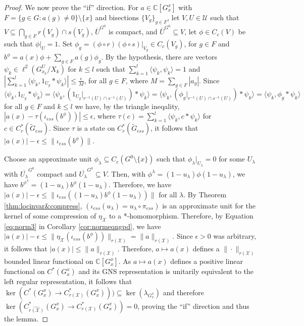\documentclass[a4paper, 12pt]{amsart}
\theoremstyle{definition}
\theoremstyle{remark}
\numberwithin{equation}{section}
\begin{document}
\begin{proof}
We now prove the ``if'' direction. For $a\in \mathbb{C}[G^{x}_{x}]$ with $F = \{g\in G:a(g)\neq 0\}\setminus \{x\}$ and bisections $\{V_{g}\}_{g\in F}$, let $V,U\in\mathcal{U}$ such that $V\subseteq \bigcap_{g\in F}r(V_{g})\cap s(V_{g})$, $\overline{U}^{G^{0}}$ is compact, and $\overline{U}^{G^{0}}\subseteq V$, let $\phi\in C_{c}(V)$ be such that $\phi|_{U} = 1$. Set $\phi_{g} = (\phi\circ r)(\phi\circ s)|_{V_{g}}\in C_{c}(V_{g})$, for $g\in F$ and $b^{\phi} = a(x)\phi + \sum_{g\in F}a(g)\phi_{g}$. By the hypothesis, there are vectors $\psi_{k}\in \ell^{2}(G^{U}_{x_{k}}/X_{k})$ for $k\leq l$ such that $\sum^{l}_{k=1} \langle\psi_{k}, \psi_{k}\rangle = 1$ and $|\sum^{l}_{k=1}\langle \psi_{k}, 1_{U_{g}}*\psi_{k}\rangle| \leq \frac{\epsilon}{M}$, for all $g\in F$, where $M = \sum_{g\in F} |a_{g}|$. Since $\langle \psi_{k}, 1_{U_{g}}*\psi_{k}\rangle = \langle \psi_{k}, (1_{U_{g}}|_{r^{-1}(U)\cap s^{-1}(U)})*\psi_{k}\rangle = \langle \psi_{k}, (\phi_{g}|_{r^{-1}(U)\cap s^{-1}(U)})*\psi_{k}\rangle = \langle \psi_{k}, \phi_{g}*\psi_{k}\rangle$ for all $g\in F$ and $k\leq l$ we have, by the triangle ineqality, $|a(x) - \tau(\iota_{ess}(b^{\phi}))|\leq \epsilon$, where $\tau(c) = \sum^{l}_{k=1}\langle \psi_{k}, c*\psi_{k}\rangle$ for $c\in C^{*}_{r}(\tilde{G}_{ess})$. Since $\tau$ is a state on $C^{*}_{r}(\tilde{G}_{ess})$, it follows that $|a(x)| - \epsilon \leq \|\iota_{ess}(b^{\phi})\|$. 

Choose an approximate unit $\phi_{\lambda}\subseteq C_{c}(G^{0}\setminus \{x\})$ such that $\phi_{\lambda}|_{U_{\lambda}} = 0$ for some $U_{\lambda}$ with $\overline{U_{\lambda}}^{G^{0}}$ compact and $\overline{U_{\lambda}}^{G^{0}}\subseteq V$. Then, with $\phi^{\lambda} = (1-u_{\lambda})\phi(1-u_{\lambda})$, we have $b^{\phi^{\lambda}} = (1-u_{\lambda})b^{\phi}(1-u_{\lambda})$. Therefore, we have $|a(x)| - \epsilon \leq \|\iota_{ess}((1-u_{\lambda})b^{\phi}(1-u_{\lambda}))\|$ for all $\lambda$. By Theorem \ref{thm:locinvar&compress}, $(\iota_{ess}(u_{\lambda}) = u_{\lambda}\circ \pi_{ess})$ is an approximate unit for the kernel of some compression of $\eta_{\mathcal{X}}$ to a *-homomorphism. Therefore, by Equation \ref{eq:norm3} in Corollary \ref{cor:normeqngpd}, we have $|a(x)| - \epsilon \leq \|\eta_{\mathcal{X}}(\iota_{ess}(b^{\phi}))\|_{r(\mathcal{X})} = \|a\|_{r(\mathcal{X})}$. Since $\epsilon > 0$ was arbitrary, it follows that $|a(x)|\leq \|a\|_{r(\mathcal{X})}$. Therefore, $a\mapsto a(x)$ defines a $\|\cdot\|_{r(\mathcal{X})}$ bounded linear functional on $\mathbb{C}[G^{x}_{x}]$. As $a\mapsto a(x)$ defines a positive linear functional on $C^{*}(G^{x}_{x})$ and its GNS representation is unitarily equivalent to the left regular representation, it follows that $\ker(C^{*}(G_{x}^{x})\to C_{r(\mathcal{X})}^{*}(G^{x}_{x})))\subseteq \ker(\lambda_{G^{x}_{x}})$ and therefore $\ker(C^{*}_{\widehat{r(\mathcal{X})}}(G^{x}_{x})\to C^{*}_{r(\mathcal{X})}(G^{x}_{x})) = 0$, proving the ``if'' direction and thus the lemma. 
\end{proof}
\end{document}
